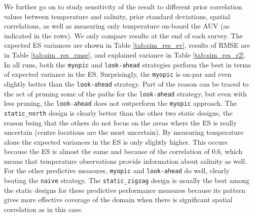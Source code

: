 \documentclass[aoas]{imsart}
\begin{document}
We further go on to study sensitivity of the result to different prior correlation values between temperature and salinity, prior standard deviations, spatial correlations, as well as measuring only temperature on-board the AUV (as indicated in the rows). We only compare results at the end of each survey. The expected ES variances are shown in Table \ref{tab:sim_res_ev}, results of RMSE are in Table \ref{tab:sim_res_rmse}, and explained variance in Table \ref{tab:sim_res_r2}. In all runs, both the \texttt{myopic} and \texttt{look-ahead} strategies perform the best in terms of expected variance in the ES. Surprisingly, the \texttt{myopic} is on-par and even slightly better than the \texttt{look-ahead} strategy. Part of the reason can be traced to the act of pruning some of the paths for the \texttt{look-ahead} strategy, but even with less pruning, the \texttt{look-ahead} does not outperform the \texttt{myopic} approach. The \texttt{static\_north} design is clearly better than the other two static designs, the reason being that the others do not focus on the areas where the ES is really uncertain (centre locations are the most uncertain). By measuring temperature alone the expected variances in the ES is only slightly higher. This occurs because the ES is almost the same and because of the correlation of $0.6$, which means that temperature observations provide information about salinity as well. For the other predictive measures, \texttt{myopic} and \texttt{look-ahead} do well, clearly beating the \texttt{naive} strategy. The \texttt{static\_zigzag} design is usually the best among the static designs for these predictive performance measures because its pattern gives more effective coverage of the domain when there is significant spatial correlation as in this case.
\end{document}
